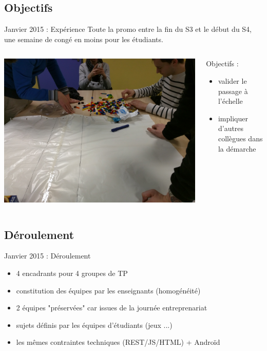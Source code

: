 \documentclass{beamer}
\begin{document}
\subsection{Objectifs}
\begin{frame}{Janvier 2015 : Expérience}
  Toute la promo entre la fin du S3 et le début du S4, une semaine de congé en moins pour les étudiants.
  \begin{columns}
    \begin{column}{0.5\textwidth}
      \begin{center}
        \includegraphics[width=\textwidth]{includes/201501_lego.jpg}      
      \end{center}
    \end{column}
    \begin{column}{0.5\textwidth}
      Objectifs : 
      \begin{itemize}
        \item valider le passage à l'échelle
        \item impliquer d'autres collègues dans la démarche
      \end{itemize}
    \end{column}
  \end{columns}
\end{frame}

\subsection{Déroulement}
\begin{frame}{Janvier 2015 : Déroulement}
  \begin{itemize}
    \item 4 encadrants pour 4 groupes de TP
    \item constitution des équipes par les enseignants (homogénéité)
    \item 2 équipes "préservées" car issues de la journée entreprenariat 
    \item sujets définis par les équipes d'étudiants (jeux ...)
    \item les mêmes contraintes techniques (REST/JS/HTML) + Androïd
  \end{itemize}
\end{frame}
\end{document}
